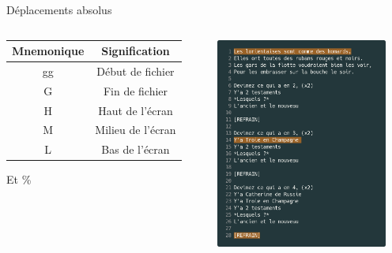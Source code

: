 \documentclass[10pt]{beamer}
\begin{document}
	\begin{frame}{Déplacements absolus}
		\begin{columns}[C]
			\begin{column}{0.50\textwidth}
				\center
				\begin{tabular}{|c|c|}
					\hline
					\textbf{Mnemonique} & \textbf{Signification} \\ 
					\hline
					\hline
					gg & Début de fichier \\ 
					\hline
					G & Fin de fichier \\ 
					\hline
					H & Haut de l'écran \\ 
					\hline
					M & Milieu de l'écran \\ 
					\hline
					L & Bas de l'écran \\ 
					\hline
				\end{tabular}

				\vspace{10pt}
				\Large Et \%
			\end{column}
			\begin{column}{0.47\textwidth}
				\includegraphics[width=160pt]{img/position.png}
			\end{column}
		\end{columns}

	\end{frame}
\end{document}
